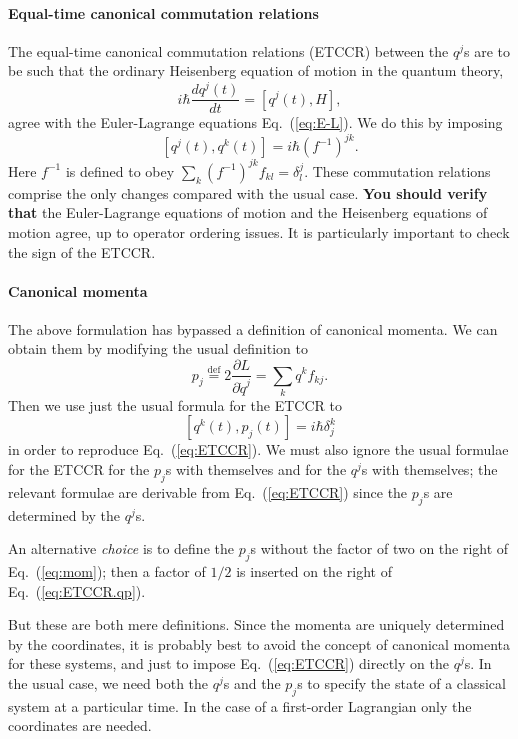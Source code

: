\documentclass{article}
\providecommand{\eqdef}{\stackrel{\textrm{def}}{=}}
\begin{document}
\paragraph{Equal-time canonical commutation relations}
The equal-time canonical commutation relations (ETCCR) between the
$q^j$s are to be such that the ordinary Heisenberg equation of motion
in the quantum theory,
\begin{equation}
  \label{eq:e.of.m}
  i \hbar \frac{dq^j(t)}{dt} = [q^j(t), H],
\end{equation}
agree with the Euler-Lagrange equations Eq.\ (\ref{eq:E-L}).  We do
this by imposing
\begin{equation}
  \label{eq:ETCCR}
  [q^j(t), q^k(t)] = i \hbar (f^{-1})^{jk} .
\end{equation}
Here $f^{-1}$ is defined to obey $\sum_k (f^{-1})^{jk} f_{kl} = \delta^j_l$.
These commutation relations comprise the only changes compared with
the usual case.  \textbf{You should verify that} the Euler-Lagrange
equations of motion and the Heisenberg equations of motion agree, up
to operator ordering issues.  It is particularly important to check
the sign of the ETCCR.


\paragraph{Canonical momenta}
The above formulation has bypassed a definition of canonical momenta.
We can obtain them by modifying the usual definition to
\begin{equation}
  \label{eq:mom}
  p_j \eqdef 2 \frac{\partial L}{\partial \dot{q}^j} = \sum_k q^k f_{kj}.
\end{equation}
Then we use just the usual formula for the ETCCR to
\begin{equation}
  \label{eq:ETCCR.qp}
  [q^k(t), p_j(t)] = i \hbar \delta^k_j
\end{equation}
in order to reproduce Eq.\ (\ref{eq:ETCCR}).  We must also ignore the
usual formulae for the ETCCR for the $p_j$s with themselves and for
the $q^j$s with themselves; the relevant formulae are derivable from
Eq.\ (\ref{eq:ETCCR}) since the $p_j$s are determined by the $q^j$s.

An alternative \emph{choice} is to define the $p_j$s without the
factor of two on the right of Eq.\ (\ref{eq:mom}); then a factor of
$1/2$ is inserted on the right of Eq.\ (\ref{eq:ETCCR.qp}).

But these are both mere definitions.  Since the momenta are uniquely
determined by the coordinates, it is probably best to avoid the
concept of canonical momenta for these systems, and just to impose
Eq.\ (\ref{eq:ETCCR}) directly on the $q^j$s.  In the usual case, we
need both the $q^j$s and the $p_j$s to specify the state of a
classical system at a particular time.  In the case of a first-order
Lagrangian only the coordinates are needed.
\end{document}
